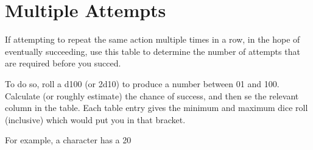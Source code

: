 \onecolumn

\chapter{Multiple Attempts}\label{S:Multi}
\normalsize
If attempting to repeat the same action multiple times in a row, in the hope of eventually succeeding, use this table to determine the number of attempts that are required before you succed. 

To do so, roll a d100 (or 2d10) to produce a number between 01 and 100. Calculate (or roughly estimate) the chance of success, and then se the relevant column in the table. Each table entry gives the minimum and maximum dice roll (inclusive) which would put you in that bracket. 

For example, a character has a 20%

